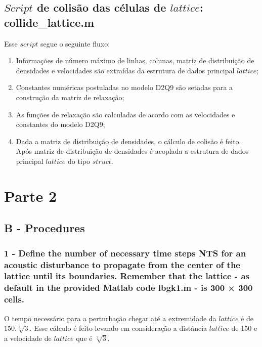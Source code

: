 \section{$Script$ de colisão das células de $lattice$: collide\_lattice.m}
Esse $script$ segue o seguinte fluxo:
\begin{enumerate}
	\item Informações de número máximo de linhas, colunas, matriz de distribuição de densidades e velocidades são extraídas da estrutura de dados principal $lattice$;
	\item Constantes numéricas postuladas no modelo D2Q9 são setadas para a construção da matriz de relaxação;
	\item As funções de relaxação são calculadas de acordo com as velocidades e constantes do modelo D2Q9;
	\item Dada a matriz de distribuição de densidades, o cálculo de colisão é feito. Após matriz de distribuição de densidades é acoplada a estrutura de dados principal $lattice$ do tipo $struct$.
\end{enumerate}




\chapter{Parte 2}\label{parte_2}

\section{B - Procedures} %
\label{sec:procedures}
	
	\subsection{1 - Define the number of necessary time steps NTS for an acoustic disturbance to propagate from the center
of the lattice until its boundaries. Remember that the lattice - as default in the provided Matlab code lbgk1.m - is 300 × 300 cells.} O tempo necessário para a perturbação chegar até a extremidade da $lattice$ é de $150 . \sqrt[2]{3}$. Esse cálculo é feito levando em consideração a distância $lattice$ de 150 e a velocidade de $lattice$ que é $\sqrt[2]{3}$.

